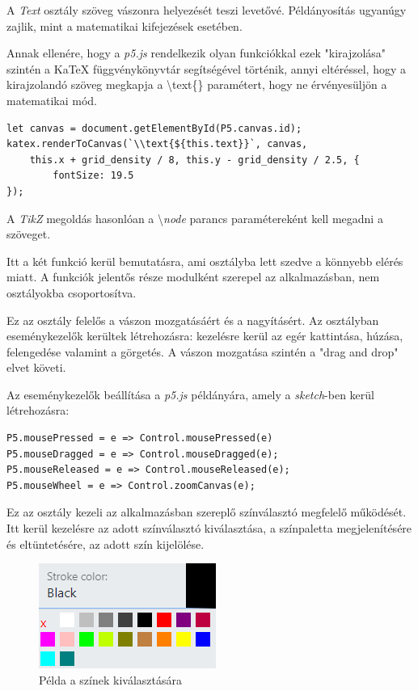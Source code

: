 
A \textit{Text} osztály szöveg vászonra helyezését teszi levetővé. Példányosítás ugyanúgy zajlik, mint a matematikai kifejezések esetében.

Annak ellenére, hogy a \textit{p5.js} rendelkezik olyan funkciókkal ezek "kirajzolása" szintén a KaTeX függvénykönyvtár segítségével történik, annyi eltéréssel, hogy a kirajzolandó szöveg megkapja a \textbackslash text\{\} paramétert, hogy ne érvényesüljön a matematikai mód.

\begin{lstlisting}[style=ES6]
let canvas = document.getElementById(P5.canvas.id);
katex.renderToCanvas(`\\text{${this.text}}`, canvas, 
    this.x + grid_density / 8, this.y - grid_density / 2.5, {
	    fontSize: 19.5
});
\end{lstlisting}

A \textit{TikZ} megoldás hasonlóan a \textbackslash \textit{node} parancs paramétereként kell megadni a szöveget.


Itt a két funkció kerül bemutatásra, ami osztályba lett szedve a könnyebb elérés miatt. A funkciók jelentős része modulként szerepel az alkalmazásban, nem osztályokba csoportosítva.


Ez az osztály felelős a vászon mozgatásáért és a nagyításért. Az osztályban eseménykezelők kerültek létrehozásra: kezelésre kerül az egér kattintása, húzása, felengedése valamint a görgetés. A vászon mozgatása szintén a "drag and drop" elvet követi.

Az eseménykezelők beállítása a \textit{p5.js} példányára, amely a \textit{sketch}-ben kerül létrehozásra:

\begin{lstlisting}[style=ES6]
P5.mousePressed = e => Control.mousePressed(e)
P5.mouseDragged = e => Control.mouseDragged(e);
P5.mouseReleased = e => Control.mouseReleased(e);
P5.mouseWheel = e => Control.zoomCanvas(e);
\end{lstlisting}


Ez az osztály kezeli az alkalmazásban szereplő színválasztó megfelelő működését. Itt kerül kezelésre az adott színválasztó kiválasztása, a színpaletta megjelenítésére és eltüntetésére, az adott szín kijelölése. 

\begin{figure}[!h]
	\centering
	\label{fig:cp2}
	\includegraphics[]{images/colorpicker.png}
	\caption{Példa a színek kiválasztására}
\end{figure}


